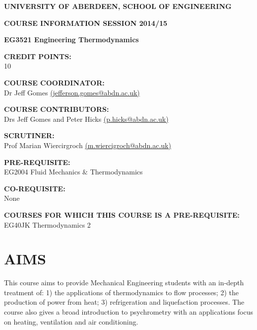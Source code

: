 \documentclass[12pts,a4paper,amsmath,amssymb,floatfix]{article}%
\begin{document}
\begin{center}
{\large {\bf UNIVERSITY OF ABERDEEN, SCHOOL OF ENGINEERING}}
\medskip

{\large {\bf COURSE INFORMATION SESSION 2014/15}}
\bigskip 

{\Large {\bf EG3521 Engineering Thermodynamics}}
\end{center}

\bigskip
\begin{flushleft}

{\large {\bf CREDIT POINTS:}}\\
\hspace{0.8cm}10
\medskip

{\large {\bf COURSE COORDINATOR: }}\\
\hspace{0.8cm}Dr Jeff Gomes \href{mailto:jefferson.gomes@abdn.ac.uk}{(jefferson.gomes@abdn.ac.uk)}
\medskip 

{\large {\bf COURSE CONTRIBUTORS:}}\\
\hspace{0.8cm} Drs Jeff Gomes and Peter Hicks \href{mailto:p.hicks@abdn.ac.uk}{(p.hicks@abdn.ac.uk)} 
\medskip

{\large {\bf SCRUTINER:}}\\
\hspace{0.8cm}Prof Marian Wiercirgroch \href{mailto:m.wiercigroch@abdn.ac.uk}{(m.wiercigroch@abdn.ac.uk)}
\medskip  

{\large {\bf PRE-REQUISITE:}}\\
\hspace{0.8cm}EG2004 Fluid Mechanics $\&$ Thermodynamics
\medskip

{\large {\bf CO-REQUISITE:}}\\
\hspace{0.8cm}None
\medskip 

{\large {\bf COURSES FOR WHICH THIS COURSE IS A PRE-REQUISITE:}}\\
\hspace{0.8cm}EG40JK Thermodynamics 2
\end{flushleft}

\clearpage

\section{AIMS}
This course aims to provide Mechanical Engineering students with an in-depth treatment of: 1) the applications of thermodynamics to flow processes; 2) the production of power from heat; 3) refrigeration and liquefaction processes. The course also gives a broad introduction to psychrometry with an applications focus on heating, ventilation and air conditioning.
\end{document}
